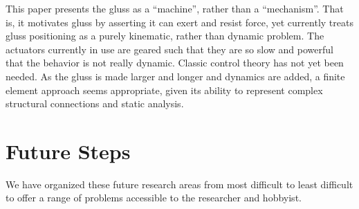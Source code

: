 \documentclass[11pt]{article}
\begin{document}
This paper presents the gluss as a ``machine'', rather than a ``mechanism''. That is, it motivates gluss
by asserting it can exert and resist force, yet currently treats gluss positioning as a purely kinematic,
rather than dynamic problem. The actuators currently in use are geared such that they are so slow
and powerful that the behavior is not really dynamic. Classic control theory has not yet been needed.
As the gluss is made larger and longer and dynamics are added,
a finite element approach\cite{géradin2001flexible} seems appropriate,
given its ability to represent complex structural connections and static analysis.



\section{Future Steps}
\label{futuresteps}

We have organized these future research areas from most difficult to least
difficult to offer a range of problems accessible to the researcher and hobbyist.
\end{document}
